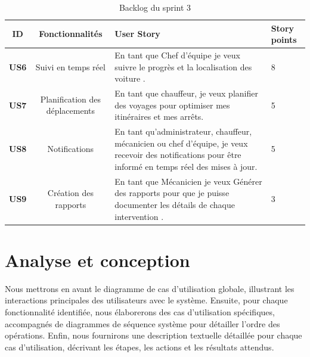 \begin{table}[htbp]
    \centering
    \renewcommand{\arraystretch}{1.2} %
    \begin{tabular}{|c|c|p{7.8cm}|p{1cm}|}
        \hline
        \textbf{ID}  & \textbf{Fonctionnalités}       & \centering \textbf{User Story}                                                                                                                          & \textbf { Story points} \\
        \hline

        \textbf{US6} & Suivi en temps réel            & En tant que Chef d'équipe je veux suivre le progrès et la localisation des voiture .                                                                    & 8                       \\
        \hline
        \textbf{US7} & Planification des déplacements & En tant que chauffeur, je veux planifier des voyages pour optimiser mes itinéraires et mes arrêts.                                                      & 5                       \\
        \hline
        \textbf{US8} & Notifications                  & En tant qu’administrateur, chauffeur, mécanicien ou chef d’équipe, je veux recevoir des notifications pour être informé en temps réel des mises à jour. & 5                       \\
        \hline
        \textbf{US9} & Création des rapports          & En tant que Mécanicien je veux Générer des rapports pour que je puisse documenter les détails de chaque intervention .                                  & 3                       \\
        \hline
    \end{tabular}
    \caption{Backlog du sprint 3}

\end{table}

\section{Analyse et conception}

Nous mettrons en avant le diagramme de cas d'utilisation globale, illustrant les interactions principales des utilisateurs avec le système. Ensuite, pour chaque fonctionnalité identifiée, nous élaborerons des cas d'utilisation spécifiques, accompagnés de diagrammes de séquence système pour détailler l'ordre des opérations. Enfin, nous fournirons une description textuelle détaillée pour chaque cas d'utilisation, décrivant les étapes, les actions et les résultats attendus.

